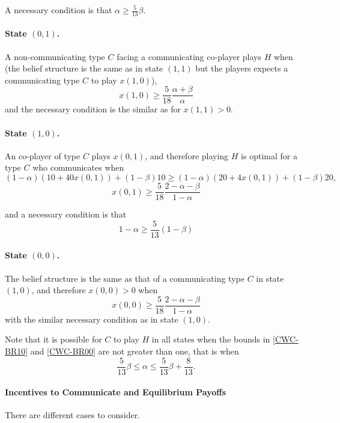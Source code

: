 \documentclass[12pt]{article}
\theoremstyle{break}
\begin{document}
A necessary condition is that $\alpha\geq \frac{5}{13}\beta$.

\paragraph{State $(0,1)$.} A non-communicating type $C$ facing a communicating co-player plays $H$ when (the belief structure is the same as in state $(1,1)$ but the players expects a communicating type $C$ to play $x(1,0)$),
\begin{equation}\label{CWC-BR01}
	x(1,0)\geq \frac{5}{18}\frac{\alpha+\beta}{\alpha}
\end{equation}
%
and the necessary condition is the similar as for $x(1,1)>0$.

\paragraph{State $(1,0)$.} An co-player of type $C$ plays $x(0,1)$, and therefore playing $H$ is optimal for a type $C$ who communicates when
\[
(1-\alpha)(10+40x(0,1))+(1-\beta) 10 \geq (1-\alpha)(20+4x(0,1))+(1-\beta) 20,
\]
\begin{equation}\label{CWC-BR10}
	x(0,1)\geq \frac{5}{18}\frac{2-\alpha-\beta}{1-\alpha}
\end{equation}

and a necessary condition is that 
\[
1-\alpha\geq \frac{5}{13}(1-\beta)
\]
%
\paragraph{State $(0,0)$.} The belief structure is the same as that of a communicating type $C$ in state $(1,0)$, and therefore $x(0,0)>0$ when
\begin{equation}\label{CWC-BR00}
	x(0,0)\geq \frac{5}{18}\frac{2-\alpha-\beta}{1-\alpha}
\end{equation}
with the similar necessary condition as in state $(1,0)$.

Note that it is possible for $C$ to play $H$ in all states when the bounds in \eqref{CWC-BR10} and \eqref{CWC-BR00} are not greater than one, that is when
\begin{equation}\label{xij>0-CWC}
	\frac{5}{13}\beta\leq \alpha \leq \frac{5}{13}\beta+\frac{8}{13}.
\end{equation}
%
\paragraph{Incentives to Communicate and Equilibrium Payoffs}
There are different cases to consider.
\end{document}
